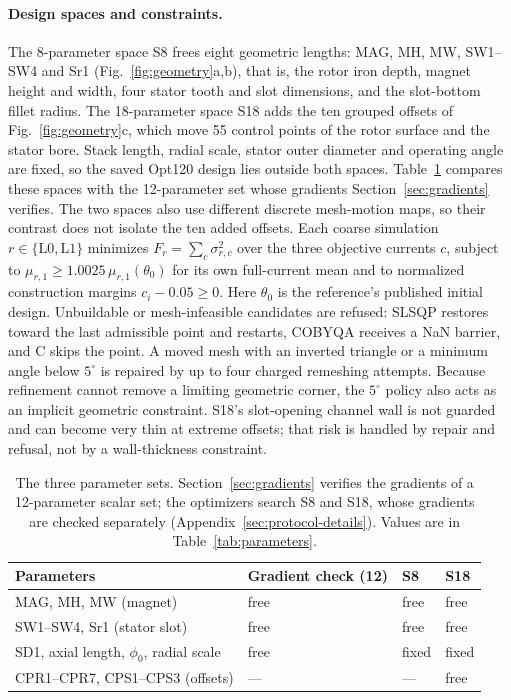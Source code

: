 \paragraph{Design spaces and constraints.}
The 8-parameter space S8 frees eight geometric lengths: MAG, MH, MW,
SW1--SW4 and Sr1 (Fig.~\ref{fig:geometry}a,b), that is, the rotor iron
depth, magnet height and width, four stator tooth and slot dimensions, and
the slot-bottom fillet radius. The 18-parameter space S18 adds the ten
grouped offsets of Fig.~\ref{fig:geometry}c, which move 55 control points
of the rotor surface and the stator bore. Stack length, radial scale,
stator outer diameter and operating angle are fixed, so the saved Opt120
design lies outside both spaces. Table~\ref{tab:paramsets} compares these
spaces with the 12-parameter set whose gradients Section~\ref{sec:gradients}
verifies. The two spaces also use different discrete mesh-motion maps, so
their contrast does not isolate the ten added offsets.
Each coarse simulation $r\in\{\mathrm{L0},\mathrm{L1}\}$ minimizes
$F_r=\sum_c\sigma_{r,c}^2$ over the three objective currents $c$, subject to
$\mu_{r,1}\geq1.0025\,\mu_{r,1}(\theta_0)$ for its own full-current mean and to
normalized construction margins $c_i-0.05\geq0$. Here $\theta_0$ is the
reference's published initial design. Unbuildable or
mesh-infeasible candidates are refused: SLSQP restores toward the last
admissible point and restarts, COBYQA receives a NaN barrier, and C skips
the point. A moved mesh with an inverted triangle or a minimum angle below
$5^\circ$ is repaired by up to four charged remeshing attempts. Because
refinement cannot remove a limiting geometric corner, the $5^\circ$ policy
also acts as an implicit geometric constraint. S18's slot-opening
channel wall is not guarded and can become very thin at extreme offsets;
that risk is handled by repair and refusal, not by a wall-thickness
constraint.

\begin{table}[H]\centering\small
\caption{The three parameter sets. Section~\ref{sec:gradients} verifies
the gradients of a 12-parameter scalar set; the optimizers search S8 and
S18, whose gradients are checked separately
(Appendix~\ref{sec:protocol-details}). Values are in
Table~\ref{tab:parameters}.}
\label{tab:paramsets}
\begin{tabular}{llll}\toprule
Parameters & Gradient check (12) & S8 & S18\\\midrule
MAG, MH, MW (magnet) & free & free & free\\
SW1--SW4, Sr1 (stator slot) & free & free & free\\
SD1, axial length, $\phi_0$, radial scale & free & fixed & fixed\\
CPR1--CPR7, CPS1--CPS3 (offsets) & --- & --- & free\\\bottomrule
\end{tabular}
\end{table}

